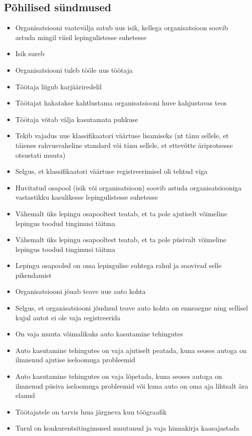 \subsection{Põhilised sündmused}
\begin{itemize}
	\item Organisatsiooni vaatevälja satub uus isik, kellega organisatsioon soovib  astuda mingil viisil lepingulistesse suhetesse
	\item Isik sureb
	\item Organisatsiooni tuleb tööle uus töötaja
	\item Töötaja liigub karjääriredelil
	\item Töötajat hakatakse kahtlustama organisatsiooni huve kahjustavas teos
	\item Töötaja võtab välja kasutamata puhkuse
	\item Tekib vajadus uue klassifikaatori väärtuse lisamiseks (nt tänu sellele, et täienes rahvusvaheline standard või tänu sellele, et ettevõtte äriprotsesse otsustati muuta)
	\item Selgus, et klassifikaatori väärtuse registreerimisel oli tehtud viga
	\item Huvitatud osapool (isik või organisatsioon) soovib astuda organisatsiooniga vastastikku kasulikesse lepingulistesse suhetesse
	\item Vähemalt üks lepingu osapooltest teatab, et ta pole ajutiselt võimeline lepingus toodud tingimusi täitma
	\item Vähemalt üks lepingu osapooltest teatab, et ta pole püsivalt võimeline lepingus toodud tingimusi täitma
	\item Lepingu osapooled on oma lepingulise suhtega rahul ja soovivad selle pikendamist
	\item Organisatsiooni jõuab teave uue auto kohta
	\item Selgus, et organisatsiooni jõudnud teave auto kohta on enneaegne ning sellisel kujul autot ei ole vaja registreerida
	\item On vaja muuta võimalikuks auto kasutamine tehingutes
	\item Auto kasutamine tehingutes on vaja ajutiselt peatada, kuna seoses autoga on ilmnenud ajutise iseloomuga probleemid
	\item Auto kasutamine tehingutes on vaja lõpetada, kuna seoses autoga on ilmnenud püsiva iseloomuga probleemid või kuna auto on oma aja lihtsalt ära elanud
	\item Töötajatele on tarvis luua järgneva kuu töögraafik
	\item Turul on konkurentsitingimused muutunud ja vaja hinnakirja kaasajastada

\end{itemize}
